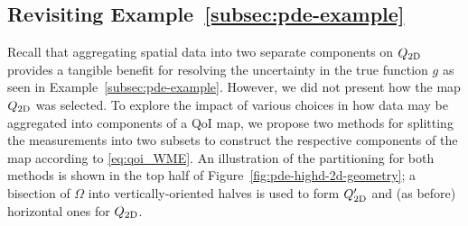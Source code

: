 \subsection{Revisiting Example~\ref{subsec:pde-example}}
Recall that aggregating spatial data into two separate components on $Q_\text{2D}$ provides a tangible benefit for resolving the uncertainty in the true function $g$ as seen in Example~\ref{subsec:pde-example}.
However, we did not present how the map $Q_\text{2D}$ was selected.
To explore the impact of various choices in how data may be aggregated into components of a QoI map, we propose two methods for splitting the measurements into two subsets to construct the respective components of the map according to \eqref{eq:qoi_WME}.
An illustration of the partitioning for both methods is shown in the top half of Figure~\ref{fig:pde-highd-2d-geometry}; a bisection of $\Omega$ into vertically-oriented halves is used to form $Q_\text{2D}^\prime$ and (as before) horizontal ones for $Q_\text{2D}$.

